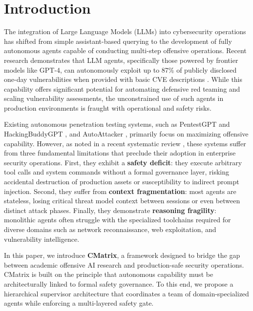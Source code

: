 \documentclass[conference,compsoc]{IEEEtran}
\begin{document}
\section{Introduction} \label{sec:intro}
The integration of Large Language Models (LLMs) into cybersecurity operations has shifted from simple assistant-based querying to the development of fully autonomous agents capable of conducting multi-step offensive operations. Recent research demonstrates that LLM agents, specifically those powered by frontier models like GPT-4, can autonomously exploit up to 87\% of publicly disclosed one-day vulnerabilities when provided with basic CVE descriptions \cite{fang2024}. While this capability offers significant potential for automating defensive red teaming and scaling vulnerability assessments, the unconstrained use of such agents in production environments is fraught with operational and safety risks.

Existing autonomous penetration testing systems, such as PentestGPT \cite{pentestgpt} and HackingBuddyGPT \cite{hackingbuddygpt}, and AutoAttacker \cite{autoattacker}, primarily focus on maximizing offensive capability. However, as noted in a recent systematic review \cite{xu2024sok}, these systems suffer from three fundamental limitations that preclude their adoption in enterprise security operations. First, they exhibit a \textbf{safety deficit}: they execute arbitrary tool calls and system commands without a formal governance layer, risking accidental destruction of production assets or susceptibility to indirect prompt injection. Second, they suffer from \textbf{context fragmentation}: most agents are stateless, losing critical threat model context between sessions or even between distinct attack phases. Finally, they demonstrate \textbf{reasoning fragility}: monolithic agents often struggle with the specialized toolchains required for diverse domains such as network reconnaissance, web exploitation, and vulnerability intelligence.

In this paper, we introduce \textbf{CMatrix}, a framework designed to bridge the gap between academic offensive AI research and production-safe security operations. CMatrix is built on the principle that autonomous capability must be architecturally linked to formal safety governance. To this end, we propose a hierarchical supervisor architecture that coordinates a team of domain-specialized agents while enforcing a multi-layered safety gate.
\end{document}
